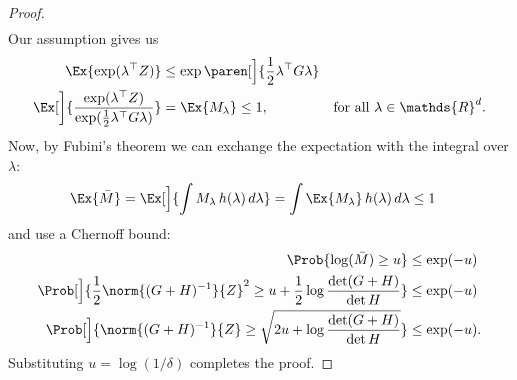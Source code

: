 \documentclass{article}
\newcommand{\inv}[1]{#1^{-1}}
\newcommand{\Real}{\mathds{R}}
\renewcommand{\det}{\operatorname{det}}
\DeclarePairedDelimiter{\paren}()
\providecommand\transp{\top}
\let\transpsymbol\transp
\renewcommand{\transp}[1]{#1^\transpsymbol}
\begin{document}
\begin{lemma}
\begin{proof}
\begin{align*}
    \end{align*}
    Our assumption gives us
    \begin{align*}
      \Ex{\exp(\transp{\lambda}Z)} &\le \exp\paren[\Big]{\frac{1}{2}\transp{\lambda}G\lambda} \\
      \Ex[\bigg]{\frac{\exp(\transp{\lambda}Z)}{\exp(\frac{1}{2}\transp{\lambda}G\lambda)}}
      &= \Ex{M_\lambda} \le 1, &\text{for all }\lambda\in\Real^d.
    \end{align*}
    Now, by Fubini's theorem we can exchange the expectation with the
    integral over $\lambda$:
    \begin{align*}
      \Ex{\bar{M}} &= \Ex[\Big]{\int M_\lambda\,h(\lambda)\,d\lambda} = \int \Ex{M_\lambda} \,h(\lambda)\,d\lambda \le 1
    \end{align*}
    and use a Chernoff bound:
    \begin{align*}
      \Prob{\log(\bar{M}) \ge u} &\le \exp(-u) \\
      \Prob[\Big]{\frac{1}{2}\norm{\inv{(G+H)}}{Z}^2 \ge u + \frac{1}{2}\log\frac{\det(G+H)}{\det H}} &\le \exp(-u) \\
      \Prob[\Big]{\norm{\inv{(G+H)}}{Z} \ge \sqrt{2u + \log\frac{\det(G+H)}{\det H}}} &\le \exp(-u).
    \end{align*}
    Substituting $u = \log(1/\delta)$ completes the proof.
  \end{proof}

\end{lemma}

\end{document}
